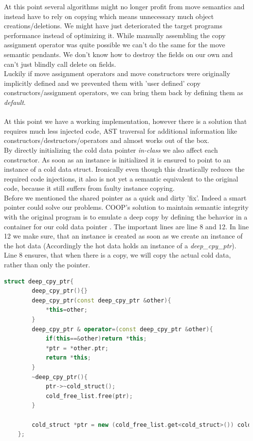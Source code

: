 At this point several algorithms might no longer profit from move semantics and instead have to rely on copying which means unnecessary much object creations/deletions. We might have just deteriorated the target programs performance instead of optimizing it. While manually assembling the copy assignment operator was quite possible we can't do the same for the move semantic pendants. We don't know how to destroy the fields on our own and can't just blindly call delete on fields.\\
Luckily if move assignment operators and move constructors were originally implicitly defined and we prevented them with 'user defined' copy constructors/assignment operators, we can bring them back by defining them as \textit{default}.\\\\
At this point we have a working implementation, however there is a solution that requires much less injected code, AST traversal for additional information like constructors/destructors/operators and almost works out of the box.\\
By directly initializing the cold data pointer \textit{in-class} we also affect each constructor. As soon as an instance is initialized it is ensured to point to an instance of a cold data struct. Ironically even though this drastically reduces the required code injections, it also is not yet a semantic equivalent to the original code, because it still suffers from faulty instance copying.\\
Before we mentioned the shared pointer as a quick and dirty 'fix'. Indeed a smart pointer could solve our problems. COOP's solution to maintain semantic integrity with the original program is to emulate a deep copy by defining the behavior in a container for our cold data pointer . The important lines are line 8 and 12. In line 12 we make sure, that an instance is created as soon as we create an instance of the hot data (Accordingly the hot data holds an instance of a \textit{deep\_cpy\_ptr}). Line 8 ensures, that when there is a copy, we will copy the actual cold data, rather than only the pointer. 
\begin{lstlisting}[language=C++, name={Shortened version of COOP's container for the pointer to the cold data struct intance. It only defines a single field (the pointer) so no additional memory space is spend.}, label={deep_cpy_ptr}]
	struct deep_cpy_ptr{
		deep_cpy_ptr(){}
		deep_cpy_ptr(const deep_cpy_ptr &other){
			*this=other;
		}
		deep_cpy_ptr & operator=(const deep_cpy_ptr &other){
			if(this==&other)return *this;
			*ptr = *other.ptr;
			return *this;
		}
		~deep_cpy_ptr(){
			ptr->~cold_struct();
			cold_free_list.free(ptr);
		}
		
		cold_struct *ptr = new (cold_free_list.get<cold_struct>()) cold_struct();
	};
\end{lstlisting}
